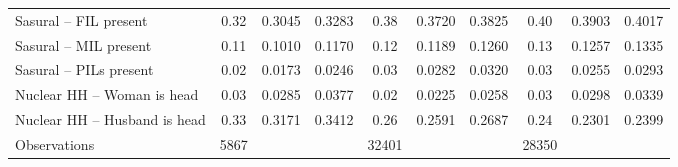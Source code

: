 {\begin{tabular}{l*{3}{ccc}}
Sasural – FIL present&        0.32&      0.3045&      0.3283&        0.38&      0.3720&      0.3825&        0.40&      0.3903&      0.4017\\
Sasural – MIL present&        0.11&      0.1010&      0.1170&        0.12&      0.1189&      0.1260&        0.13&      0.1257&      0.1335\\
Sasural – PILs present&        0.02&      0.0173&      0.0246&        0.03&      0.0282&      0.0320&        0.03&      0.0255&      0.0293\\
Nuclear HH – Woman is head&        0.03&      0.0285&      0.0377&        0.02&      0.0225&      0.0258&        0.03&      0.0298&      0.0339\\
Nuclear HH – Husband is head&        0.33&      0.3171&      0.3412&        0.26&      0.2591&      0.2687&        0.24&      0.2301&      0.2399\\
\hline
Observations        &        5867&            &            &       32401&            &            &       28350&            &            \\
\hline\hline
\end{tabular}
}
